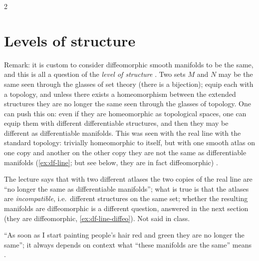 \begin{paracol}{2}
\section{Levels of structure}\label{sec:df-levels}

Remark: it is custom to consider diffeomorphic smooth manifolds to be the same, and this is all a question of the \emph{level of structure} .
Two sets $M$ and $N$ may be the same seen through the glasses of set theory (there is a bijection); equip each with a topology, and unless there exists a homeomorphism between the extended structures they are no longer the same seen through the glasses of topology. One can push this on: even if they are
homeomorphic as topological spaces, one can equip them with different differentiable structures, and then they may be different as differentiable manifolds. This was seen with the real line with the standard topology: trivially homeomorphic to itself, but with one smooth atlas on one copy and another on the other
copy they are not the same as differentiable manifolds (\cref{ex:df-line}; but see below, they are in fact diffeomorphic) .
\begin{coursenote}
The lecture says that with two different atlases the two copies of the real line are ``no longer the same as differentiable manifolds''; what is true is that the atlases are \emph{incompatible}, i.e.\ different structures on the same set; whether the resulting manifolds are diffeomorphic is
a different question, answered in the next section (they are diffeomorphic, \cref{ex:df-line-diffeo}). Not said in class.
\end{coursenote}
``As soon as I start painting people's hair red and green they are no longer the same''; it always depends on context what ``these manifolds are the same'' means .


\end{paracol}
